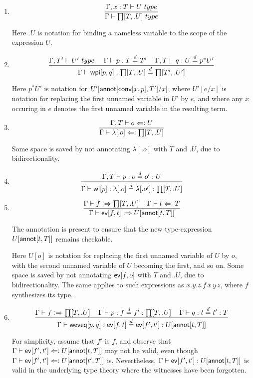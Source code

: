 \documentclass[11pt]{article}
\newcommand{\eqd}{\stackrel{d}{=}}
\newcommand{\spc}{{\,\,\,\,\,\,\,}}
\newcommand{\synth}{\vcentcolon\Rightarrow}
\newcommand{\force}{\Leftarrow\vcentcolon}
\newcommand{\Type}{\mathop{{\, \sc type}}}
\newcommand{\ha}[2]{#1[#2]}
\newcommand{\annot}{{\sf annot}}
\newcommand{\conv}{{\sf conv}}
\newcommand{\ev}{{\sf ev}}
\newcommand{\weveq}{{\sf weveq}}
\newcommand{\wl}{{\sf wl}}
\newcommand{\wpi}{{\sf wpi}}
\begin{document}
\begin{enumerate}

\item 
$$\frac{\Gamma, x:T\vdash U\Type}{\Gamma\vdash \ha\prod{T,.U}\Type}$$

Here $.U$ is notation for binding a nameless variable to the scope of the expression $U$.

\item 
$$ \frac{ 
  \Gamma, T' \vdash U'  \Type      \spc 
  \Gamma     \vdash p:T \eqd T'    \spc
  \Gamma, T  \vdash q:U \eqd p^*U'
  } {
  \Gamma     \vdash \ha\wpi{p,q}:\ha\prod{T,.U}\eqd \ha\prod{T',.U'}
}$$

Here ${p}^*U'$ is notation for $U'[\ha\annot{\ha\conv{x,p},T'}/x]$,
where $U'[e/x]$ is notation for replacing the first unnamed variable in
$U'$ by $e$, and where any $x$ occuring in $e$ denotes the first unnamed variable in
the resulting term.

\item 
$$\frac{\Gamma, T\vdash o \force U}{\Gamma\vdash \ha\lambda{.o} \force \ha\prod{T,.U}}$$

Some space is saved by not annotating $\ha\lambda{.o}$ with $T$ and $.U$, due to bidirectionality.

\item 
$$\frac{\Gamma, T\vdash p : o\eqd o' : U}{\Gamma\vdash \ha\wl{p} : \ha\lambda{.o}\eqd \ha\lambda{.o'} : \ha\prod{T,.U}}$$

\item 
$$\frac{\Gamma\vdash f \synth \ha\prod{T,.U}\spc \Gamma\vdash t \force T}{\Gamma\vdash \ha\ev{f,t} \synth U[\ha\annot{t,T}]}$$

The annotation is present to ensure that the new type-expression
$U[\ha\annot{t,T}]$ remains checkable.

Here $U[o]$ is notation for replacing the first unnamed variable of
$U$ by $o$, with the second unnamed variable of $U$ becoming the first, and
so on.  Some space is saved by not annotating $\ha\ev{f,o}$ with $T$ and
$.U$, due to bidirectionality.  The same applies to such expressions as
$x.y.z.f\, x\, y\, z$, where $f$ synthesizes its type.

\item 
$$\frac{\Gamma\vdash f \synth \ha\prod{T,.U} \spc \Gamma\vdash p : f \eqd
  f' : \ha\prod{T,.U}\spc \Gamma\vdash q : t \eqd t' : T}{\Gamma\vdash
  \ha\weveq{p,q} : \ha\ev{f,t} \eqd \ha\ev{f',t'} : U[\ha\annot{t,T}]}$$

For simplicity, assume that $f'$ is $f$, and observe that $\Gamma \vdash
\ha\ev{f',t'} \force U[\ha\annot{t,T}]$ may not be valid, even though $\Gamma
\vdash \ha\ev{f',t'} \force U[\ha\annot{t',T}]$ is.  Nevertheless, $\Gamma \vdash
\ha\ev{f',t'} : U[\ha\annot{t,T}]$ is valid in the underlying type theory where
the witnesses have been forgotten.


\end{enumerate}
\end{document}
